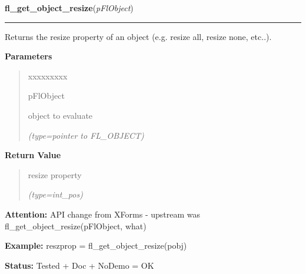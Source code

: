 \hspace{.8\funcindent}\begin{boxedminipage}{\funcwidth}

    \raggedright \textbf{fl\_get\_object\_resize}(\textit{pFlObject})

    \vspace{-1.5ex}

    \rule{\textwidth}{0.5\fboxrule}
\setlength{\parskip}{2ex}
    Returns the resize property of an object (e.g. resize all, resize none,
    etc..).

\setlength{\parskip}{1ex}
      \textbf{Parameters}
      \vspace{-1ex}

      \begin{quote}
        \begin{Ventry}{xxxxxxxxx}

          \item[pFlObject]

          object to evaluate

            {\it (type=pointer to FL\_OBJECT)}

        \end{Ventry}

      \end{quote}

      \textbf{Return Value}
    \vspace{-1ex}

      \begin{quote}
      resize property

      {\it (type=int\_pos)}

      \end{quote}

\textbf{Attention:} API change from XForms - upstream was fl\_get\_object\_resize(pFlObject, 
what)



\textbf{Example:} reszprop = fl\_get\_object\_resize(pobj)



\textbf{Status:} Tested + Doc + NoDemo = OK



    \end{boxedminipage}

    \label{xformslib:flbasic:fl_set_object_gravity}

    \vspace{0.5ex}

